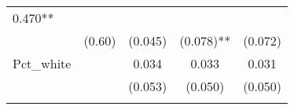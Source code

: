\documentclass[]{article}
\begin{document}
\begin{longtable}[]{@{}lcccc@{}}
\begin{minipage}[t]{0.14\columnwidth}
0.470**\strut
\end{minipage}\tabularnewline
\begin{minipage}[t]{0.26\columnwidth}\raggedright\strut
\strut
\end{minipage} & \begin{minipage}[t]{0.12\columnwidth}\centering\strut
(0.60)\strut
\end{minipage} & \begin{minipage}[t]{0.13\columnwidth}\centering\strut
(0.045)\strut
\end{minipage} & \begin{minipage}[t]{0.14\columnwidth}\centering\strut
(0.078)**\strut
\end{minipage} & \begin{minipage}[t]{0.14\columnwidth}\centering\strut
(0.072)\strut
\end{minipage}\tabularnewline
\begin{minipage}[t]{0.26\columnwidth}\raggedright\strut
Pct\_white\strut
\end{minipage} & \begin{minipage}[t]{0.12\columnwidth}\centering\strut
\strut
\end{minipage} & \begin{minipage}[t]{0.13\columnwidth}\centering\strut
0.034\strut
\end{minipage} & \begin{minipage}[t]{0.14\columnwidth}\centering\strut
0.033\strut
\end{minipage} & \begin{minipage}[t]{0.14\columnwidth}\centering\strut
0.031\strut
\end{minipage}\tabularnewline
\begin{minipage}[t]{0.26\columnwidth}\raggedright\strut
\strut
\end{minipage} & \begin{minipage}[t]{0.12\columnwidth}\centering\strut
\strut
\end{minipage} & \begin{minipage}[t]{0.13\columnwidth}\centering\strut
(0.053)\strut
\end{minipage} & \begin{minipage}[t]{0.14\columnwidth}\centering\strut
(0.050)\strut
\end{minipage} & \begin{minipage}[t]{0.14\columnwidth}\centering\strut
(0.050)\strut
\end{minipage}\tabularnewline
\begin{minipage}[t]{0.26\columnwidth}\raggedright\strut

\end{minipage}
\end{longtable}
\end{document}

